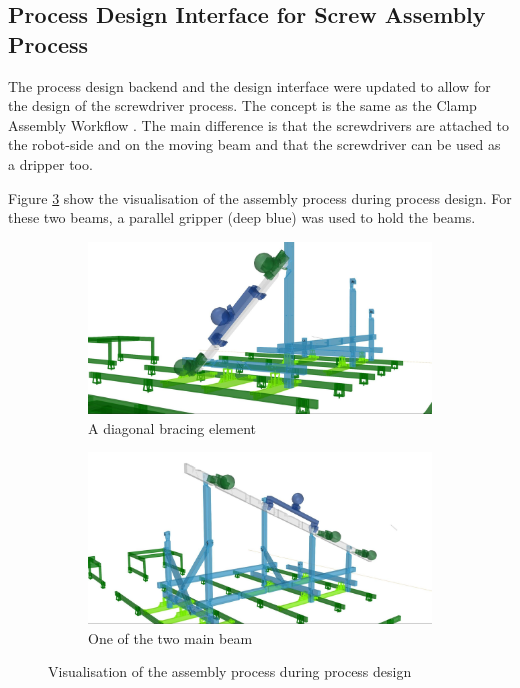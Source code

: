 \subsection{Process Design Interface for Screw Assembly Process}
\label{subsection:exploration-4-process-design-interface-for-screw-assembly-process}

The process design backend and the design interface were updated to allow for the design of the screwdriver process. The concept is the same as the Clamp Assembly Workflow . The main difference is that the screwdrivers are attached to the robot-side and on the moving beam and that the screwdriver can be used as a dripper too.

Figure \ref{fig:visualisation-of-the-assembly-process} show the visualisation of the assembly process during process design. For these two beams, a parallel gripper (deep blue) was used to hold the beams.

\begin{figure}[!h]
    \centering
    \begin{subfigure}[b]{0.49\textwidth}
        \centering
        \includegraphics[width=\textwidth]{images/7a/img85.jpg}
        \caption{A diagonal bracing element}
        \label{fig:diagonal-element}
    \end{subfigure}
    \hfill
    \begin{subfigure}[b]{0.49\textwidth}
        \centering
        \includegraphics[width=\textwidth]{images/7a/img86.jpg}
        \caption{One of the two main beam}
        \label{fig:mainbeam}
    \end{subfigure}
    \caption{Visualisation of the assembly process during process design}
    \label{fig:visualisation-of-the-assembly-process}
\end{figure}

